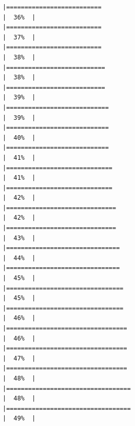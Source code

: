 \documentclass[
]{article}
\begin{document}
\begin{verbatim}
|==========================                                            |  36%  |                                                                              |==========================                                            |  37%  |                                                                              |==========================                                            |  38%  |                                                                              |===========================                                           |  38%  |                                                                              |===========================                                           |  39%  |                                                                              |============================                                          |  39%  |                                                                              |============================                                          |  40%  |                                                                              |============================                                          |  41%  |                                                                              |=============================                                         |  41%  |                                                                              |=============================                                         |  42%  |                                                                              |==============================                                        |  42%  |                                                                              |==============================                                        |  43%  |                                                                              |===============================                                       |  44%  |                                                                              |===============================                                       |  45%  |                                                                              |================================                                      |  45%  |                                                                              |================================                                      |  46%  |                                                                              |=================================                                     |  46%  |                                                                              |=================================                                     |  47%  |                                                                              |=================================                                     |  48%  |                                                                              |==================================                                    |  48%  |                                                                              |==================================                                    |  49%  |                                                                              
\end{verbatim}
\end{document}
